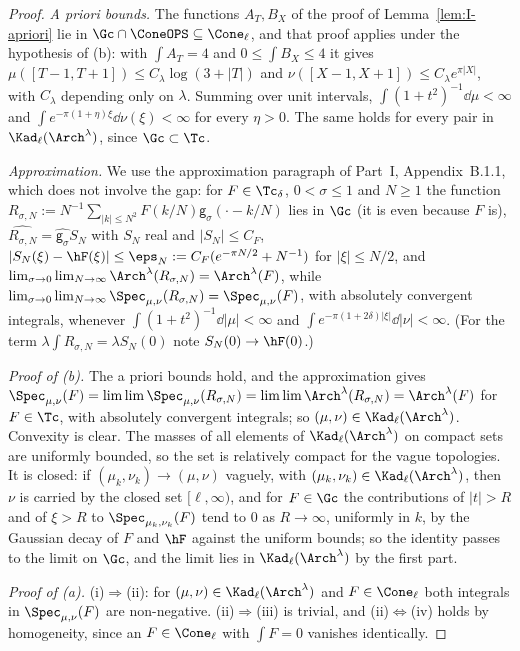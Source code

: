 \begin{proof}
\emph{A priori bounds.} The functions $A_T,B_X$ of the proof of Lemma~\ref{lem:I-apriori} lie in $\Gc\cap\ConeOPS\subseteq\Cone_\ell$, and that
proof applies under the hypothesis of (b): with $\int A_T=4$ and $0\le\int B_X\le4$ it gives $\mu([T-1,T+1])\le C_\lambda\log(3+|T|)$ and
$\nu([X-1,X+1])\le C_\lambda e^{\pi|X|}$, with $C_\lambda$ depending only on $\lambda$. Summing over unit intervals, $\int(1+t^2)^{-1}\dd\mu<\infty$
and $\int e^{-\pi(1+\eta)\xi}\dd\nu(\xi)<\infty$ for every $\eta>0$. The same holds for every pair in $\Kad_\ell(\Arch^\lambda)$, since
$\Gc\subset\Tc$.

\emph{Approximation.} We use the approximation paragraph of Part~I, Appendix~B.1.1, which does not involve the gap: for $F\in\Tc_\delta$,
$0<\sigma\le1$ and $N\ge1$ the function $R_{\sigma,N}:=N^{-1}\sum_{|k|\le N^2}F(k/N)\mathsf g_\sigma(\cdot-k/N)$ lies in $\Gc$ (it is even because $F$ is),
$\widehat{R_{\sigma,N}}=\widehat{\mathsf g_\sigma}S_N$ with $S_N$ real and $|S_N|\le C_F$, $|S_N(\xi)-\hF(\xi)|\le\eps_N:=C_F(e^{-\pi N/2}+N^{-1})$ for
$|\xi|\le N/2$, and $\lim_{\sigma\to0}\lim_{N\to\infty}\Arch^\lambda(R_{\sigma,N})=\Arch^\lambda(F)$, while
$\lim_{\sigma\to0}\lim_{N\to\infty}\Spec_{\mu,\nu}(R_{\sigma,N})=\Spec_{\mu,\nu}(F)$, with absolutely convergent integrals, whenever
$\int(1+t^2)^{-1}\dd|\mu|<\infty$ and $\int e^{-\pi(1+2\delta)|\xi|}\dd|\nu|<\infty$. (For the term $\lambda\int R_{\sigma,N}=\lambda S_N(0)$ note
$S_N(0)\to\hF(0)$.)

\emph{Proof of \textup{(b)}.} The a priori bounds hold, and the approximation gives
$\Spec_{\mu,\nu}(F)=\lim\lim\Spec_{\mu,\nu}(R_{\sigma,N})=\lim\lim\Arch^\lambda(R_{\sigma,N})=\Arch^\lambda(F)$ for $F\in\Tc$, with absolutely
convergent integrals; so $(\mu,\nu)\in\Kad_\ell(\Arch^\lambda)$. Convexity is clear. The masses of all elements of $\Kad_\ell(\Arch^\lambda)$ on compact sets
are uniformly bounded, so the set is relatively compact for the vague topologies. It is closed: if $(\mu_k,\nu_k)\to(\mu,\nu)$ vaguely, with
$(\mu_k,\nu_k)\in\Kad_\ell(\Arch^\lambda)$, then $\nu$ is carried by the closed set $[\ell,\infty)$, and for $F\in\Gc$ the contributions of $|t|>R$ and of
$\xi>R$ to $\Spec_{\mu_k,\nu_k}(F)$ tend to $0$ as $R\to\infty$, uniformly in $k$, by the Gaussian decay of $F$ and $\hF$ against the uniform bounds;
so the identity passes to the limit on $\Gc$, and the limit lies in $\Kad_\ell(\Arch^\lambda)$ by the first part.

\emph{Proof of \textup{(a)}.} (i)$\Rightarrow$(ii): for $(\mu,\nu)\in\Kad_\ell(\Arch^\lambda)$ and $F\in\Cone_\ell$ both integrals in $\Spec_{\mu,\nu}(F)$ are
non-negative. (ii)$\Rightarrow$(iii) is trivial, and (ii)$\Leftrightarrow$(iv) holds by homogeneity, since an $F\in\Cone_\ell$ with $\int F=0$ vanishes
identically.


\end{proof}
